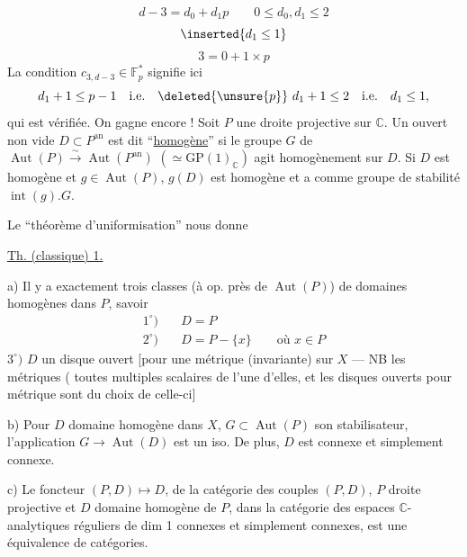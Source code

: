 \[
d-3=d_0+d_1p\qquad0\leq d_0,d_1\leq2
\]
\[\inserted{d_1\leq1}\]
\[3=0+1\times p\]
La condition $c_{3,d-3}\in\mathbb F_p^*$ signifie ici
\[
d_1+1\leq p-1\quad\text{i.e.}\quad\deleted{\unsure{p}}\ d_1+1\leq2\quad\text{i.e.}\quad d_1\leq1,
\]
qui est vérifiée. On gagne encore !
Soit $P$ une droite projective sur $\mathbb C$. Un ouvert non vide $D\subset P^{\mathrm{an}}$ est dit ``\uline{homogène}'' si le groupe $G$ de $\operatorname{Aut}(P)\xrightarrow{\sim}\operatorname{Aut}(P^{\mathrm{an}})$ $(\simeq\mathrm{GP}(1)_{\mathbb C})$ agit homogènement sur $D$. Si $D$ est homogène et $g\in\operatorname{Aut}(P)$, $g(D)$ est homogène et a comme groupe de stabilité $\operatorname{int}(g).G$.

Le ``théorème d'uniformisation'' nous donne

\uline{Th. (classique) 1.}

a) Il y a exactement trois classes (à op. près de $\operatorname{Aut}(P)$) de domaines homogènes dans $P$, savoir
\[
\begin{aligned}
1^\circ)\quad&D=P\\
2^\circ)\quad&D=P-\{x\}\qquad\text{où }x\in P
\end{aligned}
\]
$3^\circ)$ $D$ un disque ouvert [pour une métrique  (invariante) sur $X$ --- NB les métriques  ( toutes multiples scalaires de l'une d'elles, et les disques ouverts pour  métrique sont  du choix de celle-ci]

b) Pour $D$ domaine homogène dans $X$, $G\subset\operatorname{Aut}(P)$ son stabilisateur, l'application $G\longrightarrow\operatorname{Aut}(D)$ est un iso. De plus, $D$ est connexe et simplement connexe.

c) Le foncteur $(P,D)\longmapsto D$, de la catégorie  des couples $(P,D)$, $P$ droite projective et $D$ domaine homogène de $P$, dans la catégorie  des espaces $\mathbb C$-analytiques réguliers de dim 1 connexes et simplement connexes, est une équivalence de catégories.

